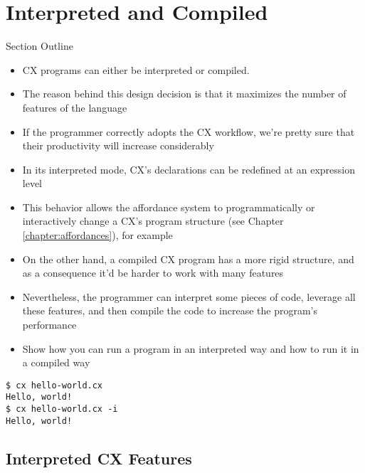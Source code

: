 \documentclass[11pt,fleqn,openany]{book} %
\begin{document}
\chapter{Interpreted and Compiled}
\label{chapter:interpreted-and-compiled}

\begin{remark}
Section Outline
    \begin{itemize}
    \item CX programs can either be interpreted or compiled.
    \item The reason behind this design decision is that it maximizes the number of features of the language
    \item If the programmer correctly adopts the CX workflow, we're pretty sure that their productivity will increase considerably
    \item In its interpreted mode, CX's declarations can be redefined at an expression level
    \item This behavior allows the affordance system to programmatically or interactively change a CX's program structure (see Chapter \ref{chapter:affordances}), for example
    \item On the other hand, a compiled CX program has a more rigid structure, and as a consequence it'd be harder to work with many features
    \item Nevertheless, the programmer can interpret some pieces of code, leverage all these features, and then compile the code to increase the program's performance
    \item Show how you can run a program in an interpreted way and how to run it in a compiled way
    \end{itemize}
\end{remark}


\begin{lstlisting}[caption={Interpreting and Compiling the same Program},captionpos=b,label={listing:interpreted-compiled}]
$ cx hello-world.cx
Hello, world!
$ cx hello-world.cx -i
Hello, world!
\end{lstlisting}

\section{Interpreted CX Features}
\end{document}
